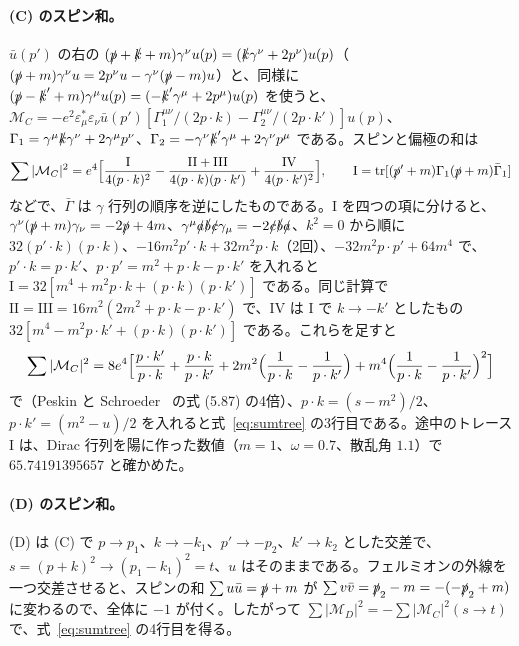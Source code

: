\documentclass[a4paper,10pt]{ltjsarticle}
\begin{document}
\paragraph{(C) のスピン和。}$\bar u(p')$ の右の $(\slashed p+\slashed k+m)\gamma^\nu u(p)=(\slashed k\gamma^\nu+2p^\nu)u(p)$（$(\slashed p+m)\gamma^\nu u=2p^\nu u-\gamma^\nu(\slashed p-m)u$）と、同様に $(\slashed p-\slashed k'+m)\gamma^\mu u(p)=(-\slashed k'\gamma^\mu+2p^\mu)u(p)$ を使うと、$\mathcal M_C=-e^2\varepsilon^*_\mu\varepsilon_\nu\bar u(p')[\Gamma_1^{\mu\nu}/(2p\cdot k)-\Gamma_2^{\mu\nu}/(2p\cdot k')]u(p)$、$\Gamma_1=\gamma^\mu\slashed k\gamma^\nu+2\gamma^\mu p^\nu$、$\Gamma_2=-\gamma^\nu\slashed k'\gamma^\mu+2\gamma^\nu p^\mu$ である。スピンと偏極の和は
\begin{equation*}
\sum|\mathcal M_C|^2=e^4\Bigl[\frac{\mathrm I}{4(p\cdot k)^2}-\frac{\mathrm{II}+\mathrm{III}}{4(p\cdot k)(p\cdot k')}+\frac{\mathrm{IV}}{4(p\cdot k')^2}\Bigr],\qquad
\mathrm I=\mathrm{tr}[(\slashed p'+m)\Gamma_1(\slashed p+m)\bar\Gamma_1]
\end{equation*}
などで、$\bar\Gamma$ は $\gamma$ 行列の順序を逆にしたものである。$\mathrm I$ を四つの項に分けると、$\gamma^\nu(\slashed p+m)\gamma_\nu=-2\slashed p+4m$、$\gamma^\mu\slashed a\slashed b\slashed c\gamma_\mu=-2\slashed c\slashed b\slashed a$、$k^2=0$ から順に $32(p'\cdot k)(p\cdot k)$、$-16m^2p'\cdot k+32m^2p\cdot k$（2回）、$-32m^2p\cdot p'+64m^4$ で、$p'\cdot k=p\cdot k'$、$p\cdot p'=m^2+p\cdot k-p\cdot k'$ を入れると $\mathrm I=32[m^4+m^2p\cdot k+(p\cdot k)(p\cdot k')]$ である。同じ計算で $\mathrm{II}=\mathrm{III}=16m^2(2m^2+p\cdot k-p\cdot k')$ で、$\mathrm{IV}$ は $\mathrm I$ で $k\to-k'$ としたもの $32[m^4-m^2p\cdot k'+(p\cdot k)(p\cdot k')]$ である。これらを足すと
\begin{equation*}
\sum|\mathcal M_C|^2=8e^4\Bigl[\frac{p\cdot k'}{p\cdot k}+\frac{p\cdot k}{p\cdot k'}+2m^2\Bigl(\frac{1}{p\cdot k}-\frac{1}{p\cdot k'}\Bigr)+m^4\Bigl(\frac{1}{p\cdot k}-\frac{1}{p\cdot k'}\Bigr)^2\Bigr]
\end{equation*}
で（Peskin と Schroeder~\cite{peskin} の式 (5.87) の4倍）、$p\cdot k=(s-m^2)/2$、$p\cdot k'=(m^2-u)/2$ を入れると式~\eqref{eq:sumtree} の3行目である。途中のトレース $\mathrm I$ は、Dirac 行列を陽に作った数値（$m=1$、$\omega=0.7$、散乱角 $1.1$）で $65.74191395657$ と確かめた。

\paragraph{(D) のスピン和。}(D) は (C) で $p\to p_1$、$k\to-k_1$、$p'\to-p_2$、$k'\to k_2$ とした交差で、$s=(p+k)^2\to(p_1-k_1)^2=t$、$u$ はそのままである。フェルミオンの外線を一つ交差させると、スピンの和 $\sum u\bar u=\slashed p+m$ が $\sum v\bar v=\slashed p_2-m=-(-\slashed p_2+m)$ に変わるので、全体に $-1$ が付く。したがって $\sum|\mathcal M_D|^2=-\sum|\mathcal M_C|^2(s\to t)$ で、式~\eqref{eq:sumtree} の4行目を得る。
\end{document}
